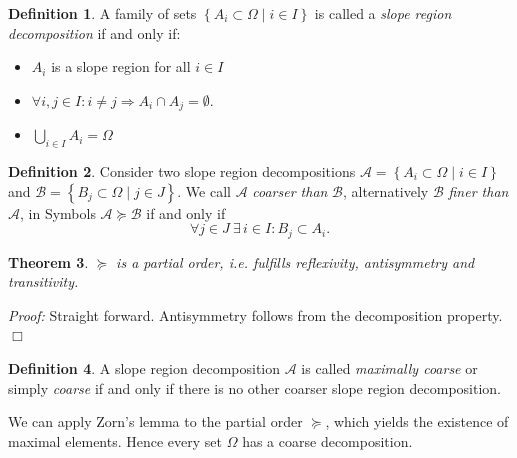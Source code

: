 \documentclass[11pt,twoside,twocolumn,a4paper]{article}
\theoremstyle{plain}
\newtheorem{thm}{Theorem}[section] %
\theoremstyle{definition}
\newtheorem{defn}[thm]{Definition} %
\begin{document}
\begin{defn}
A family of sets $\left\{ A_i \subset \Omega \mid i \in I \right\}$ is called a \emph{slope region decomposition} if and only if:
\begin{itemize}
\item $A_i$ is a slope region for all $i \in I$
\item $\forall i,j \in I: i \neq j \Rightarrow A_i \cap A_j = \emptyset$.
\item $\bigcup_{i\in I} A_i = \Omega$
\end{itemize}
\end{defn}



\begin{defn}
Consider two slope region decompositions $\mathcal{A} = \left\{ A_i \subset \Omega \mid i \in I \right\}$ and $\mathcal{B} = \left\{ B_j \subset \Omega \mid j \in J \right\}$.
We call $\mathcal{A}$ \emph{coarser than} $\mathcal{B}$, alternatively $\mathcal{B}$ \emph{finer than} $\mathcal{A}$, in Symbols $\mathcal{A} \succeq \mathcal{B}$ if and only if
\begin{equation*}
\forall j \in J ~ \exists \, i \in I: B_j \subset A_i.
\end{equation*}
\end{defn}

\begin{thm}
$\succeq$ is a partial order, i.e. fulfills reflexivity, antisymmetry and transitivity.
\end{thm}
\emph{Proof:} Straight forward. Antisymmetry follows from the decomposition property. \hfill $\Box$

\begin{defn}
A slope region decomposition $\mathcal{A}$ is called \emph{maximally coarse} or simply \emph{coarse} if and only if there is no other coarser slope region decomposition.
\end{defn}

We can apply Zorn's lemma \cite{zorn1935remark} to the partial order $\succeq$, which yields the existence of maximal elements.
Hence every set $\Omega$ has a coarse decomposition.
\end{document}
